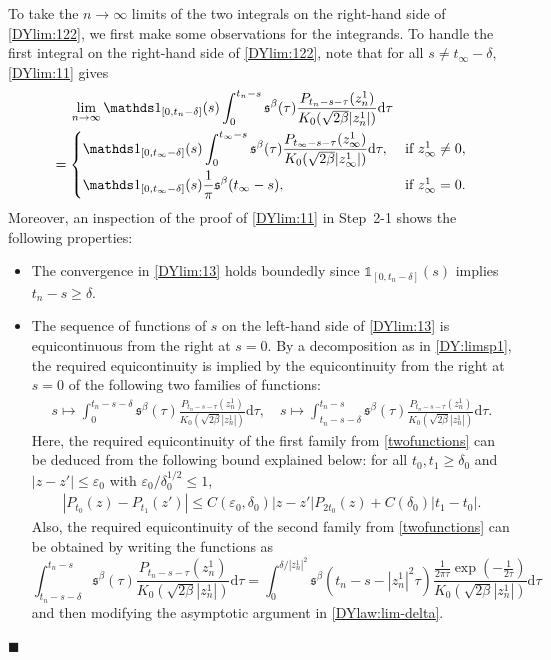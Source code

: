 \documentclass[12pt, twoside]{article}
\numberwithin{figure}{section}
\newcommand{\1}{\mathds 1}
\newcommand{\vep}{{\varepsilon}}
\renewcommand{\d}{{\mathrm d}}
\newcommand{\2}{{\mathbf 1}}
\newcommand{\s}{{\mathfrak s}}
\renewenvironment{proof}[1][\proofname]{\noindent {\bfseries #1.}\;}{\hfill\ensuremath{\blacksquare}\\}
\begin{document}
\begin{proof}[Proof of Theorem~\ref{thm:formulas}]
To take the $n\to\infty$ limits of the two integrals on the right-hand side of \eqref{DYlim:122}, we first make some observations for the integrands. To handle the first integral on the right-hand side of \eqref{DYlim:122}, note that for all $s\neq t_\infty-\delta$, \eqref{DYlim:11} gives
\begin{align}
&\quad\;\lim_{n\to\infty}\1_{[0,t_n-\delta]}(s)\int_0^{t_n-s}\s^\beta(\tau)\frac{P_{t_n-s-\tau}(z^1_n)}{K_0(\sqrt{2\beta}|z^1_n|)}\d \tau\notag\\
&=
\begin{cases}
\displaystyle \1_{[0,t_\infty-\delta]}(s)\int_0^{t_\infty-s}\s^\beta(\tau)\frac{P_{t_\infty-s-\tau}(z_\infty^1)}{K_0(\sqrt{2\beta}|z^1_\infty|)}\d \tau,&\mbox{ if } z^1_\infty\neq 0,\\
\vspace{-.4cm}\\
\displaystyle \1_{[0,t_\infty-\delta]}(s)\frac{1}{\pi}\s^\beta(t_\infty-s),& \mbox{ if }z^1_\infty=0.
\end{cases}\label{DYlim:13}
\end{align}
Moreover, an inspection of the proof of \eqref{DYlim:11} in Step~2-1 shows the following properties:
\begin{itemize}
\item The convergence in \eqref{DYlim:13} holds boundedly since $\1_{[0,t_n-\delta]}(s)$ implies $t_n-s\geq \delta$.
\item The sequence of functions of $s$ on the left-hand side of \eqref{DYlim:13} is equicontinuous from the right at $s=0$. By a decomposition as in \eqref{DY:limsp1}, the required equicontinuity is implied by the equicontinuity from the right at $s=0$ of the following two families of functions: 
\begin{align}\label{twofunctions}
s\mapsto \int_0^{t_n-s-\delta}\s^\beta(\tau)\frac{P_{t_n-s-\tau}(z^1_n)}{K_0(\sqrt{2\beta}|z^1_n|)}\d \tau,\quad s\mapsto \int_{t_n-s-\delta}^{t_n-s}\s^\beta(\tau)\frac{P_{t_n-s-\tau}(z^1_n)}{K_0(\sqrt{2\beta}|z^1_n|)}\d \tau.
\end{align}
Here, the required equicontinuity of the first family from \eqref{twofunctions}
can be deduced from the following bound explained below: for all $t_0,t_1\geq \delta_0$ and $|z-z'|\leq \vep_0$ with $\vep_0/\delta_0^{1/2}\leq 1$,
\begin{align}\label{heat:unif}
|P_{t_0}(z)-P_{t_1}(z')|\leq C(\vep_0,\delta_0)|z-z'|P_{2t_0}(z)+C(\delta_0)|t_1-t_0|.
\end{align}
Also, the required equicontinuity of the second family from \eqref{twofunctions} can be obtained by writing the functions as
\[
\int_{t_n-s-\delta}^{t_n-s}\s^\beta(\tau)\frac{P_{t_n-s-\tau}(z^1_n)}{K_0(\sqrt{2\beta}|z^1_n|)}\d \tau=\int_0^{\delta/|z^1_n|^2} \s^\beta(t_n-s-|z^1_n|^2\tau)\frac{\frac{1}{2\pi \tau}\exp\left(-\frac{1}{2\tau}\right)}{K_0(\sqrt{2\beta}|z^1_n|)}\d \tau
\]
and then modifying the asymptotic argument in \eqref{DYlaw:lim-delta}. 


\end{itemize}
\end{proof}
\end{document}
